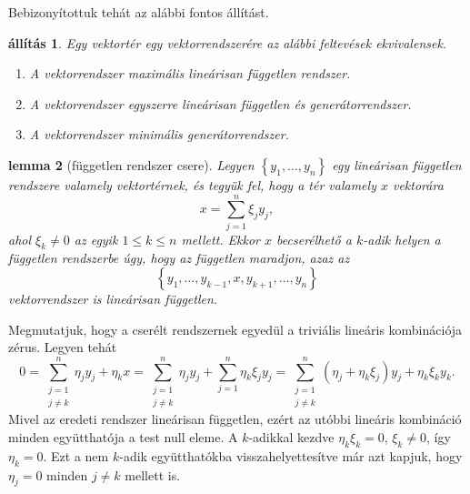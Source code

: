 \documentclass[9pt, a4paper, showtrims]{memoir}
\makeatletter
\renewenvironment{proof}[1][\proofname]
    {\par\pushQED{\qed}%
    \normalfont \topsep6\p@\@plus6\p@\relax
    \trivlist
    \item[\hskip\labelsep
        \itshape
    #1\@addpunct{:}]\ignorespaces}
    {\popQED\endtrivlist\@endpefalse}
\theoremstyle{plain}
\newtheorem{proposition}{állítás}[chapter]
\newtheorem{lemma}[proposition]{lemma}
\theoremstyle{remark}
\theoremstyle{definition}
\makeatother
\begin{document}
Bebizonyítottuk tehát az alábbi fontos állítást.
\begin{proposition}
	Egy vektortér egy vektorrendszerére az alábbi feltevések ekvivalensek.
	\begin{enumerate}
		\item A vektorrendszer maximális lineárisan független rendszer.
		\item A vektorrendszer egyszerre lineárisan független és generátorrendszer.
		\item A vektorrendszer minimális generátorrendszer.\qedhere
	\end{enumerate}
    \label{pr:maxmin}
\end{proposition}
\begin{lemma}[független rendszer csere]\label{le:fgtlncsere}
	Legyen $\left\{ y_1,\ldots,y_n \right\}$ egy lineárisan független rendszere valamely vektortérnek,
	és tegyük fel, hogy a tér valamely $x$ vektorára
	\[
		x=\sum_{j=1}^n\xi_jy_j,
	\]
	ahol $\xi_k\neq 0$ az egyik $1\leq k\leq n$ mellett.
	Ekkor $x$ becserélhető a $k$-adik helyen a független rendszerbe
	úgy, hogy az független maradjon, azaz az
	\[
		\left\{ y_1,\ldots,y_{k-1},x,y_{k+1},\ldots,y_n \right\}
	\]
	vektorrendszer is lineárisan független.
\end{lemma}
\begin{proof}
	Megmutatjuk, hogy a cserélt rendszernek egyedül a triviális lineáris kombinációja zérus.
	Legyen tehát
	\[
		0
		=\sum_{\substack{j=1\\j\neq k}}^n\eta_jy_j+\eta_kx
		=\sum_{\substack{j=1\\j\neq k}}^n\eta_jy_j+\sum_{j=1}^n\eta_k\xi_jy_j
		=\sum_{\substack{j=1\\j\neq k}}^n\left( \eta_j+\eta_k\xi_j \right)y_j+\eta_k\xi_ky_k.
	\]
	Mivel az eredeti rendszer lineárisan független,
	ezért az utóbbi lineáris kombináció minden együtthatója a test null eleme.
	A $k$-adikkal kezdve $\eta_k\xi_k=0$, $\xi_k\neq 0$, így $\eta_k=0$.
	Ezt a nem $k$-adik együtthatókba visszahelyettesítve
	már azt kapjuk, hogy $\eta_j=0$ minden $j\neq k$ mellett is.
\end{proof}
\end{document}
